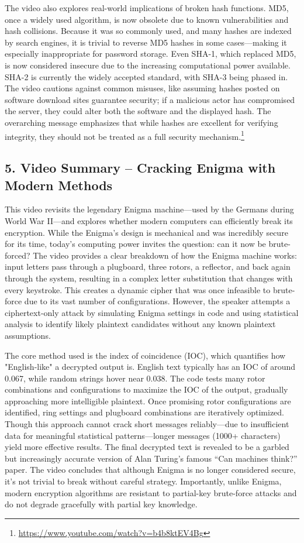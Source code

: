 \documentclass{article}
\theoremstyle{theorem}
\theoremstyle{definition}
\theoremstyle{remark}
\begin{document}
The video also explores real-world implications of broken hash functions. MD5, once a widely used algorithm, is now obsolete due to known vulnerabilities and hash collisions. Because it was so commonly used, and many hashes are indexed by search engines, it is trivial to reverse MD5 hashes in some cases—making it especially inappropriate for password storage. Even SHA-1, which replaced MD5, is now considered insecure due to the increasing computational power available. SHA-2 is currently the widely accepted standard, with SHA-3 being phased in. The video cautions against common misuses, like assuming hashes posted on software download sites guarantee security; if a malicious actor has compromised the server, they could alter both the software and the displayed hash. The overarching message emphasizes that while hashes are excellent for verifying integrity, they should not be treated as a full security mechanism.\footnote{\url{https://www.youtube.com/watch?v=b4b8ktEV4Bg}}

\subsection*{5. Video Summary – Cracking Enigma with Modern Methods}

This video revisits the legendary Enigma machine—used by the Germans during World War II—and explores whether modern computers can efficiently break its encryption. While the Enigma's design is mechanical and was incredibly secure for its time, today's computing power invites the question: can it now be brute-forced? The video provides a clear breakdown of how the Enigma machine works: input letters pass through a plugboard, three rotors, a reflector, and back again through the system, resulting in a complex letter substitution that changes with every keystroke. This creates a dynamic cipher that was once infeasible to brute-force due to its vast number of configurations. However, the speaker attempts a ciphertext-only attack by simulating Enigma settings in code and using statistical analysis to identify likely plaintext candidates without any known plaintext assumptions.

The core method used is the index of coincidence (IOC), which quantifies how "English-like" a decrypted output is. English text typically has an IOC of around 0.067, while random strings hover near 0.038. The code tests many rotor combinations and configurations to maximize the IOC of the output, gradually approaching more intelligible plaintext. Once promising rotor configurations are identified, ring settings and plugboard combinations are iteratively optimized. Though this approach cannot crack short messages reliably—due to insufficient data for meaningful statistical patterns—longer messages (1000+ characters) yield more effective results. The final decrypted text is revealed to be a garbled but increasingly accurate version of Alan Turing's famous “Can machines think?” paper. The video concludes that although Enigma is no longer considered secure, it’s not trivial to break without careful strategy. Importantly, unlike Enigma, modern encryption algorithms are resistant to partial-key brute-force attacks and do not degrade gracefully with partial key knowledge.
\end{document}
